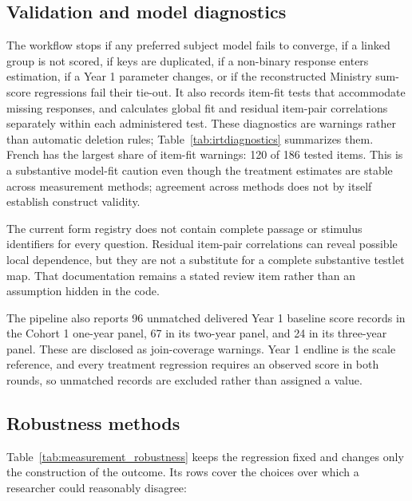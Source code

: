 \subsection{Validation and model diagnostics}

The workflow stops if any preferred subject model fails to converge, if a
linked group is not scored, if keys are duplicated, if a non-binary response
enters estimation, if a Year 1 parameter changes, or if the reconstructed
Ministry sum-score regressions fail their tie-out. It also records item-fit
tests that accommodate missing responses, and calculates global fit and
residual item-pair correlations separately within each administered test. These
diagnostics are warnings rather than automatic deletion rules;
Table~\ref{tab:irtdiagnostics} summarizes them. French has the largest share
of item-fit warnings: 120 of 186 tested items. This is a substantive model-fit
caution even though the treatment estimates are stable across measurement
methods; agreement across methods does not by itself establish construct
validity.

The current form registry does not contain complete passage or stimulus
identifiers for every question. Residual item-pair correlations can reveal
possible local dependence, but they are not a substitute for a complete
substantive testlet map. That documentation remains a stated review item rather
than an assumption hidden in the code.

The pipeline also reports 96 unmatched delivered Year 1 baseline score records
in the Cohort 1 one-year panel, 67 in its two-year panel, and 24 in its
three-year panel. These are disclosed as join-coverage warnings. Year 1
endline is the scale reference, and every treatment regression requires an
observed score in both rounds, so unmatched records are excluded rather than
assigned a value.

\subsection{Robustness methods}

Table~\ref{tab:measurement_robustness} keeps the regression fixed and changes
only the construction of the outcome. Its rows cover the choices over which a
researcher could reasonably disagree:

